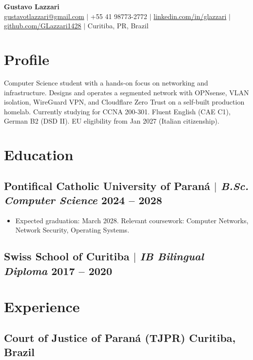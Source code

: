 \documentclass[10.5pt]{article}
\begin{document}
\begin{center}
    {\LARGE\bfseries Gustavo Lazzari} \\
    \vspace{2pt}
    \href{mailto:gustavotlazzari@gmail.com}{gustavotlazzari@gmail.com} $|$
    +55 41 98773-2772 $|$
    \href{https://www.linkedin.com/in/glazzari}{linkedin.com/in/glazzari} $|$
    \href{https://github.com/GLazzari1428}{github.com/GLazzari1428} $|$
    Curitiba, PR, Brazil
\end{center}

\section{Profile}
Computer Science student with a hands-on focus on networking and infrastructure. Designs and operates
a segmented network with OPNsense, VLAN isolation, WireGuard VPN, and Cloudflare Zero Trust on a
self-built production homelab. Currently studying for CCNA 200-301. Fluent English (CAE C1), German
B2 (DSD II). EU eligibility from Jan 2027 (Italian citizenship).

\section{Education}
\subsection{Pontifical Catholic University of Paran\'{a} $|$ {\normalfont\itshape B.Sc. Computer Science} \hfill 2024 -- 2028}
\begin{itemize}
    \item Expected graduation: March 2028. Relevant coursework: Computer Networks, Network Security, Operating Systems.
\end{itemize}
\subsection{Swiss School of Curitiba $|$ {\normalfont\itshape IB Bilingual Diploma} \hfill 2017 -- 2020}

\section{Experience}
\subsection{Court of Justice of Paran\'{a} (TJPR) \hfill Curitiba, Brazil}
\end{document}

